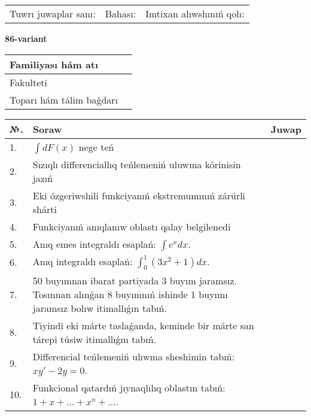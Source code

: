 \documentclass{article}
\begin{document}
\vspace{1cm}

\begin{tabular}{ c c c }
Tuwrı juwaplar sanı: \underline{\hspace{2cm}} & Bahası: \underline{\hspace{2cm}} & Imtixan alıwshınıń qolı: \underline{\hspace{2cm}} \\
\end{tabular}

\newpage

\begin{center}\textbf{86-variant}\end{center}

\bgroup
\def\arraystretch{1.5}
\begin{tabular}{ |m{6cm}|m{10cm}| }
  \hline
  Familiyası hám atı & \\
  \hline
  Fakulteti &\\
  \hline
  Toparı hám tálim baǵdarı & \\
  \hline
\end{tabular}
\egroup

\vspace{0.5cm}

\bgroup
\def\arraystretch{2}
\begin{tabular}{ |l|m{8cm}|m{7cm}| }
  \hline
  №. & Soraw & Juwap \\
  \hline
  1. & $\displaystyle\int dF(x)$ nege teń &  \\
  \hline
  2. & Sızıqlı differenciallıq teńlemeniń uluwma kórinisin jazıń &  \\
  \hline
  3. & Eki ózgeriwshili funkciyanıń ekstremumınıń zárúrli shárti &  \\
  \hline
  4. & Funkciyanıń anıqlanıw oblastı qalay belgilenedi &  \\
  \hline
  5. & Anıq emes integraldı esaplań: $\displaystyle\int e^{x}dx$. &  \\
  \hline
  6. & Anıq integraldı esaplań: $\displaystyle\int_{0}^{1}{(3x^{2} + 1)dx}$. &  \\
  \hline
  7. & 50 buyımnan ibarat partiyada 3 buyım jaramsız. Tosınnan alınǵan 8 buyımnıń ishinde 1 buyımı jaramsız bolıw itimallıǵın tabıń. &  \\
  \hline
  8. & Tiyindi eki márte taslaǵanda, keminde bir márte san tárepi túsiw itimallıǵın tabıń. &  \\
  \hline
  9. & Differencial teńlemeniń ulıwma sheshimin tabıń: $xy' - 2y = 0$. &  \\
  \hline
  10. & Funkcional qatardıń jıynaqlılıq oblastın tabıń: $1 + x + \ldots + x^{n} + \ldots$. &  \\
  \hline
\end{tabular}
\egroup
\end{document}
